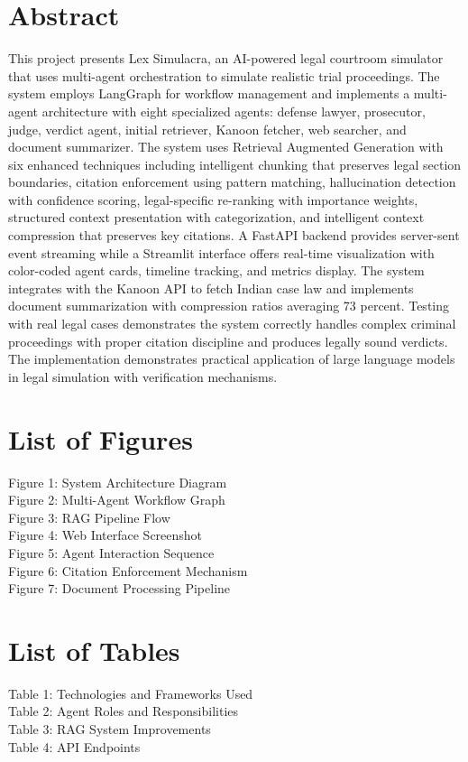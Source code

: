 \documentclass[12pt,singleside,a4paper]{article}
\begin{document}
\section*{Abstract}
This project presents Lex Simulacra, an AI-powered legal courtroom simulator that uses multi-agent orchestration to simulate realistic trial proceedings. The system employs LangGraph for workflow management and implements a multi-agent architecture with eight specialized agents: defense lawyer, prosecutor, judge, verdict agent, initial retriever, Kanoon fetcher, web searcher, and document summarizer. The system uses Retrieval Augmented Generation with six enhanced techniques including intelligent chunking that preserves legal section boundaries, citation enforcement using pattern matching, hallucination detection with confidence scoring, legal-specific re-ranking with importance weights, structured context presentation with categorization, and intelligent context compression that preserves key citations. A FastAPI backend provides server-sent event streaming while a Streamlit interface offers real-time visualization with color-coded agent cards, timeline tracking, and metrics display. The system integrates with the Kanoon API to fetch Indian case law and implements document summarization with compression ratios averaging 73 percent. Testing with real legal cases demonstrates the system correctly handles complex criminal proceedings with proper citation discipline and produces legally sound verdicts. The implementation demonstrates practical application of large language models in legal simulation with verification mechanisms.

\pagebreak
\section*{List of Figures}
Figure 1: System Architecture Diagram\\
Figure 2: Multi-Agent Workflow Graph\\
Figure 3: RAG Pipeline Flow\\
Figure 4: Web Interface Screenshot\\
Figure 5: Agent Interaction Sequence\\
Figure 6: Citation Enforcement Mechanism\\
Figure 7: Document Processing Pipeline\\

\pagebreak
\section*{List of Tables}
Table 1: Technologies and Frameworks Used\\
Table 2: Agent Roles and Responsibilities\\
Table 3: RAG System Improvements\\
Table 4: API Endpoints\\
\end{document}
